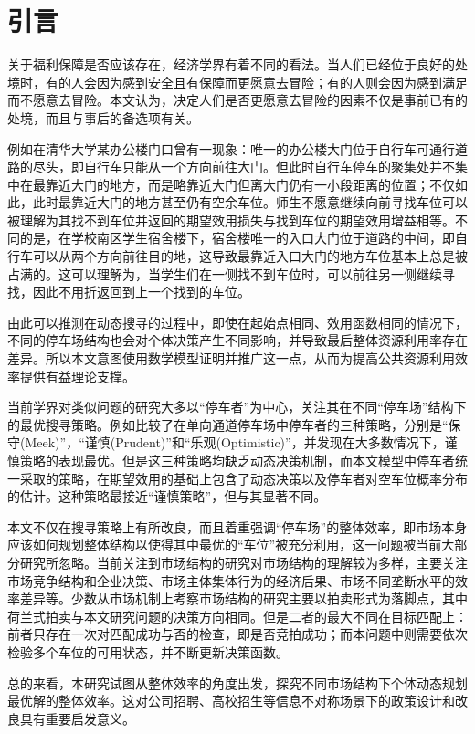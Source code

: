 \documentclass{thuemp}
\begin{document}
\section{引言}
\par 关于福利保障是否应该存在，经济学界有着不同的看法。当人们已经位于良好的处境时，有的人会因为感到安全且有保障而更愿意去冒险；有的人则会因为感到满足而不愿意去冒险。本文认为，决定人们是否更愿意去冒险的因素不仅是事前已有的处境，而且与事后的备选项有关。
\par 例如在清华大学某办公楼门口曾有一现象：唯一的办公楼大门位于自行车可通行道路的尽头，即自行车只能从一个方向前往大门。但此时自行车停车的聚集处并不集中在最靠近大门的地方，而是略靠近大门但离大门仍有一小段距离的位置；不仅如此，此时最靠近大门的地方甚至仍有空余车位。师生不愿意继续向前寻找车位可以被理解为其找不到车位并返回的期望效用损失与找到车位的期望效用增益相等。不同的是，在学校南区学生宿舍楼下，宿舍楼唯一的入口大门位于道路的中间，即自行车可以从两个方向前往目的地，这导致最靠近入口大门的地方车位基本上总是被占满的。这可以理解为，当学生们在一侧找不到车位时，可以前往另一侧继续寻找，因此不用折返回到上一个找到的车位。
\par 由此可以推测在动态搜寻的过程中，即使在起始点相同、效用函数相同的情况下，不同的停车场结构也会对个体决策产生不同影响，并导致最后整体资源利用率存在差异。所以本文意图使用数学模型证明并推广这一点，从而为提高公共资源利用效率提供有益理论支撑。
\par 当前学界对类似问题的研究大多以“停车者”为中心，关注其在不同“停车场”结构下的最优搜寻策略。例如\citet*{krapivsky_simpleparkingstrategies_2019}比较了在单向通道停车场中停车者的三种策略，分别是“保守(Meek)”，“谨慎(Prudent)”和“乐观(Optimistic)”，并发现在大多数情况下，谨慎策略的表现最优。但是这三种策略均缺乏动态决策机制，而本文模型中停车者统一采取的策略，在期望效用的基础上包含了动态决策以及停车者对空车位概率分布的估计。这种策略最接近“谨慎策略”，但与其显著不同。
\par 本文不仅在搜寻策略上有所改良，而且着重强调“停车场”的整体效率，即市场本身应该如何规划整体结构以使得其中最优的“车位”被充分利用，这一问题被当前大部分研究所忽略。当前关注到市场结构的研究对市场结构的理解较为多样，主要关注市场竞争结构和企业决策\citep*{bar-isaac_searchdesignmarket_2012, DuChuang_pingtaineishichangjiegoushejijianlunwangshangwaimaishangyemoshiyuguanzhi_2024}、市场主体集体行为的经济后果\citep{becker_irrationalbehavioreconomic_1962}、市场不同垄断水平的效率差异\citep{MengShanShan_shichangjiegouchuangxinshouyigongyinglianfenpeiyuchanyefazhan_2024a}等。少数从市场机制上考察市场结构的研究主要以拍卖形式为落脚点\citep{lucking-reiley_usingfieldexperiments_1999}，其中荷兰式拍卖与本文研究问题的决策方向相同。但是二者的最大不同在目标匹配上：前者只存在一次对匹配成功与否的检查，即是否竞拍成功；而本问题中则需要依次检验多个车位的可用状态，并不断更新决策函数。
\par 总的来看，本研究试图从整体效率的角度出发，探究不同市场结构下个体动态规划最优解的整体效率。这对公司招聘、高校招生等信息不对称场景下的政策设计和改良具有重要启发意义。
\end{document}
